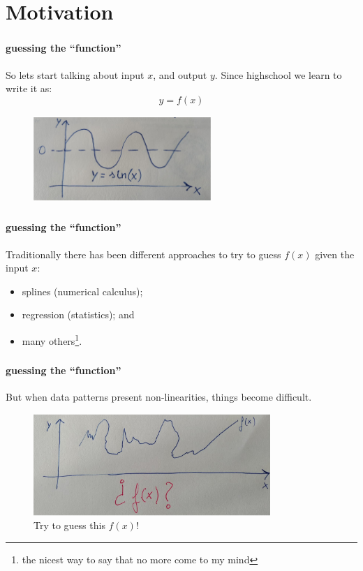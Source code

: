 \documentclass{beamer}
\begin{document}
\section{Motivation}
\begin{frame}
    \frametitle{\insertsection}
    \framesubtitle{guessing the ``function'' }

    So lets start talking about input $x$, and output $y$. Since highschool we learn to write it as:
    \begin{equation*}
        y = f(x)
    \end{equation*}

    \begin{figure}
        \centering
        \includegraphics[width=0.6\textwidth]{img/sine.png}
        \caption{}
        \label{fig:sine}
    \end{figure}
\end{frame}


\begin{frame}
    \frametitle{\insertsection}
    \framesubtitle{guessing the ``function'' }

    Traditionally there has been different approaches
    to try to guess $f(x)$ given the input $x$:
    \begin{itemize}
        \item splines (numerical calculus);
        \item regression (statistics); and
        \item many others\footnote{the nicest way to say that no more come to my mind}.
    \end{itemize}
\end{frame}



\begin{frame}
    \frametitle{\insertsection}
    \framesubtitle{guessing the ``function'' }

    But when data patterns present non-linearities, things become difficult.

    \begin{figure}
        \centering
        \includegraphics[width=0.8\textwidth]{img/strange-function.png}
        \caption{Try to guess this $f(x)$!}
        \label{fig:strange}
    \end{figure}
\end{frame}
\end{document}
